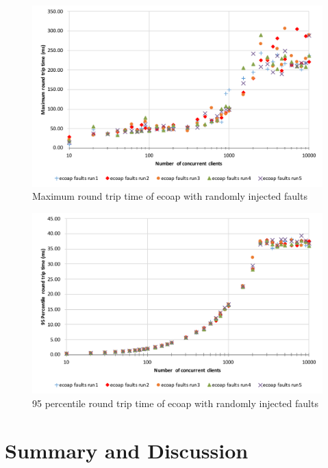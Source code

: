 \begin{figure}[!htbp]
\centering
\includegraphics[scale = 0.8]{ecoap_max_round_trip_time_faults}
\caption{Maximum round trip time of ecoap with randomly injected faults}
\label{fig:ecoap_max_round_trip_time_faults}
\end{figure}

\begin{figure}[!htbp]
\centering
\includegraphics[scale = 0.8]{ecoap_95p_round_trip_time_faults}
\caption{95 percentile round trip time of ecoap with randomly injected faults}
\label{fig:ecoap_95p_round_trip_time_faults}
\end{figure}

\section{Summary and Discussion}


